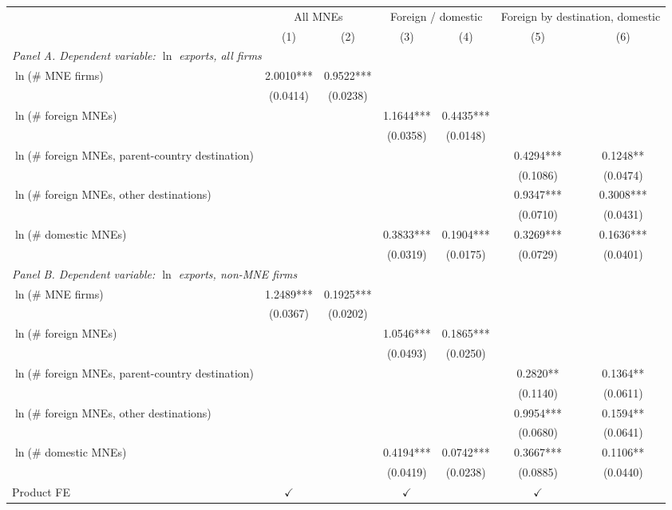\begin{tabular}{lcccccc} \hline
 & \multicolumn{2}{c}{All MNEs} & \multicolumn{2}{c}{Foreign / domestic} & \multicolumn{2}{c}{Foreign by destination, domestic} \\
 & (1) & (2) & (3) & (4) & (5) & (6) \\ \hline
\multicolumn{7}{l}{\textit{Panel A. Dependent variable: $\ln$ exports, all firms}} \\
$\ln$(\# MNE firms) & 2.0010*** & 0.9522*** &  &  &  &  \\
 & (0.0414) & (0.0238) &  &  &  &  \\
$\ln$(\# foreign MNEs) &  &  & 1.1644*** & 0.4435*** &  &  \\
 &  &  & (0.0358) & (0.0148) &  &  \\
$\ln$(\# foreign MNEs, parent-country destination) &  &  &  &  & 0.4294*** & 0.1248** \\
 &  &  &  &  & (0.1086) & (0.0474) \\
$\ln$(\# foreign MNEs, other destinations) &  &  &  &  & 0.9347*** & 0.3008*** \\
 &  &  &  &  & (0.0710) & (0.0431) \\
$\ln$(\# domestic MNEs) &  &  & 0.3833*** & 0.1904*** & 0.3269*** & 0.1636*** \\
 &  &  & (0.0319) & (0.0175) & (0.0729) & (0.0401) \\
\midrule
\multicolumn{7}{l}{\textit{Panel B. Dependent variable: $\ln$ exports, non-MNE firms}} \\
$\ln$(\# MNE firms) & 1.2489*** & 0.1925*** &  &  &  &  \\
 & (0.0367) & (0.0202) &  &  &  &  \\
$\ln$(\# foreign MNEs) &  &  & 1.0546*** & 0.1865*** &  &  \\
 &  &  & (0.0493) & (0.0250) &  &  \\
$\ln$(\# foreign MNEs, parent-country destination) &  &  &  &  & 0.2820** & 0.1364** \\
 &  &  &  &  & (0.1140) & (0.0611) \\
$\ln$(\# foreign MNEs, other destinations) &  &  &  &  & 0.9954*** & 0.1594** \\
 &  &  &  &  & (0.0680) & (0.0641) \\
$\ln$(\# domestic MNEs) &  &  & 0.4194*** & 0.0742*** & 0.3667*** & 0.1106** \\
 &  &  & (0.0419) & (0.0238) & (0.0885) & (0.0440) \\
\hline
Product FE & $\checkmark$ &  & $\checkmark$ &  & $\checkmark$ &  \\

\end{tabular}
